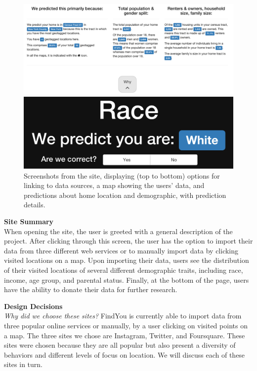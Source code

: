 \begin{figure}
  \includegraphics[width=\linewidth]{fig/findyou/home-detail.png}

  \includegraphics[width=\linewidth]{fig/findyou/race.png}
  \caption{Screenshots from the site, displaying (top to bottom) options for linking to data sources, a map showing the users' data, and predictions about home location and demographic, with prediction details.}
  \label{fig:findyou_screencap}
\end{figure}

\textbf{Site Summary} \\
When opening the site, the user is greeted with a general description of the project. After clicking through this screen, the user has the option to import their data from three different web services or to manually import data by clicking visited locations on a map. Upon importing their data, users see the distribution of their visited locations of several different demographic traits, including race, income, age group, and parental status. Finally, at the bottom of the page, users have the ability to donate their data for further research.

\textbf{Design Decisions} \\
\emph{Why did we choose these sites?}
FindYou is currently able to import data from three popular online services or manually, by a user clicking on visited points on a map. The three sites we chose are Instagram, Twitter, and Foursquare. These sites were chosen because they are all popular but also present a diversity of behaviors and different levels of focus on location. We will discuss each of these sites in turn.

